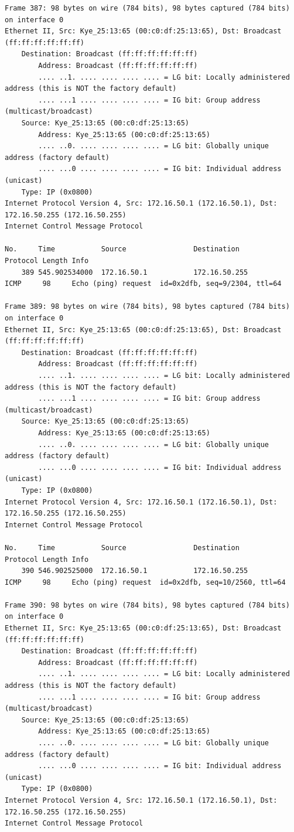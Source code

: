 \documentclass[a4paper,11pt]{article}
\begin{document}
\begin{lstlisting}
Frame 387: 98 bytes on wire (784 bits), 98 bytes captured (784 bits) on interface 0
Ethernet II, Src: Kye_25:13:65 (00:c0:df:25:13:65), Dst: Broadcast (ff:ff:ff:ff:ff:ff)
    Destination: Broadcast (ff:ff:ff:ff:ff:ff)
        Address: Broadcast (ff:ff:ff:ff:ff:ff)
        .... ..1. .... .... .... .... = LG bit: Locally administered address (this is NOT the factory default)
        .... ...1 .... .... .... .... = IG bit: Group address (multicast/broadcast)
    Source: Kye_25:13:65 (00:c0:df:25:13:65)
        Address: Kye_25:13:65 (00:c0:df:25:13:65)
        .... ..0. .... .... .... .... = LG bit: Globally unique address (factory default)
        .... ...0 .... .... .... .... = IG bit: Individual address (unicast)
    Type: IP (0x0800)
Internet Protocol Version 4, Src: 172.16.50.1 (172.16.50.1), Dst: 172.16.50.255 (172.16.50.255)
Internet Control Message Protocol

No.     Time           Source                Destination           Protocol Length Info
    389 545.902534000  172.16.50.1           172.16.50.255         ICMP     98     Echo (ping) request  id=0x2dfb, seq=9/2304, ttl=64

Frame 389: 98 bytes on wire (784 bits), 98 bytes captured (784 bits) on interface 0
Ethernet II, Src: Kye_25:13:65 (00:c0:df:25:13:65), Dst: Broadcast (ff:ff:ff:ff:ff:ff)
    Destination: Broadcast (ff:ff:ff:ff:ff:ff)
        Address: Broadcast (ff:ff:ff:ff:ff:ff)
        .... ..1. .... .... .... .... = LG bit: Locally administered address (this is NOT the factory default)
        .... ...1 .... .... .... .... = IG bit: Group address (multicast/broadcast)
    Source: Kye_25:13:65 (00:c0:df:25:13:65)
        Address: Kye_25:13:65 (00:c0:df:25:13:65)
        .... ..0. .... .... .... .... = LG bit: Globally unique address (factory default)
        .... ...0 .... .... .... .... = IG bit: Individual address (unicast)
    Type: IP (0x0800)
Internet Protocol Version 4, Src: 172.16.50.1 (172.16.50.1), Dst: 172.16.50.255 (172.16.50.255)
Internet Control Message Protocol

No.     Time           Source                Destination           Protocol Length Info
    390 546.902525000  172.16.50.1           172.16.50.255         ICMP     98     Echo (ping) request  id=0x2dfb, seq=10/2560, ttl=64

Frame 390: 98 bytes on wire (784 bits), 98 bytes captured (784 bits) on interface 0
Ethernet II, Src: Kye_25:13:65 (00:c0:df:25:13:65), Dst: Broadcast (ff:ff:ff:ff:ff:ff)
    Destination: Broadcast (ff:ff:ff:ff:ff:ff)
        Address: Broadcast (ff:ff:ff:ff:ff:ff)
        .... ..1. .... .... .... .... = LG bit: Locally administered address (this is NOT the factory default)
        .... ...1 .... .... .... .... = IG bit: Group address (multicast/broadcast)
    Source: Kye_25:13:65 (00:c0:df:25:13:65)
        Address: Kye_25:13:65 (00:c0:df:25:13:65)
        .... ..0. .... .... .... .... = LG bit: Globally unique address (factory default)
        .... ...0 .... .... .... .... = IG bit: Individual address (unicast)
    Type: IP (0x0800)
Internet Protocol Version 4, Src: 172.16.50.1 (172.16.50.1), Dst: 172.16.50.255 (172.16.50.255)
Internet Control Message Protocol


\end{lstlisting}
\end{document}
